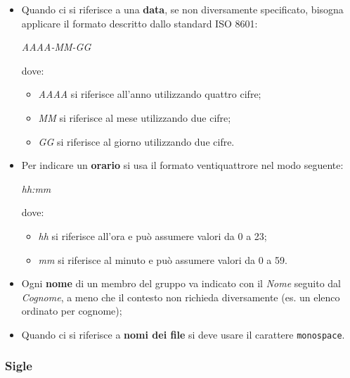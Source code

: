 	\begin{itemize}
	
		\item Quando ci si riferisce a una \textbf{data}, se non diversamente specificato, bisogna applicare il formato descritto dallo standard ISO 8601:
		\begin{center}

			\textit{AAAA-MM-GG}
		
		\end{center}
		dove:
		\begin{itemize}

			\item \textit{AAAA} si riferisce all'anno utilizzando quattro cifre;			
			\item \textit{MM} si riferisce al mese utilizzando due cifre;
			\item \textit{GG} si riferisce al giorno utilizzando due cifre.
		
		\end{itemize}
		
		\item Per indicare un \textbf{orario} si usa il formato ventiquattrore nel modo seguente:
		
		\begin{center}

			\textit{hh:mm}		
		
		\end{center}
		dove:
		\begin{itemize}
		
			\item \textit{hh} si riferisce all'ora e può assumere valori da 0 a 23;
			\item \textit{mm} si riferisce al minuto e può assumere valori da 0 a 59.		
		
		\end{itemize}
	
		\item Ogni \textbf{nome} di un membro del gruppo va indicato con il \textit{Nome} seguito dal \textit{Cognome}, a meno che il contesto non richieda diversamente (es. un elenco ordinato per cognome);
		\item Quando ci si riferisce a \textbf{nomi dei file} si deve usare il carattere \texttt{monospace}.
		
	\end{itemize}		
	
	\subsubsection{Sigle}
	
